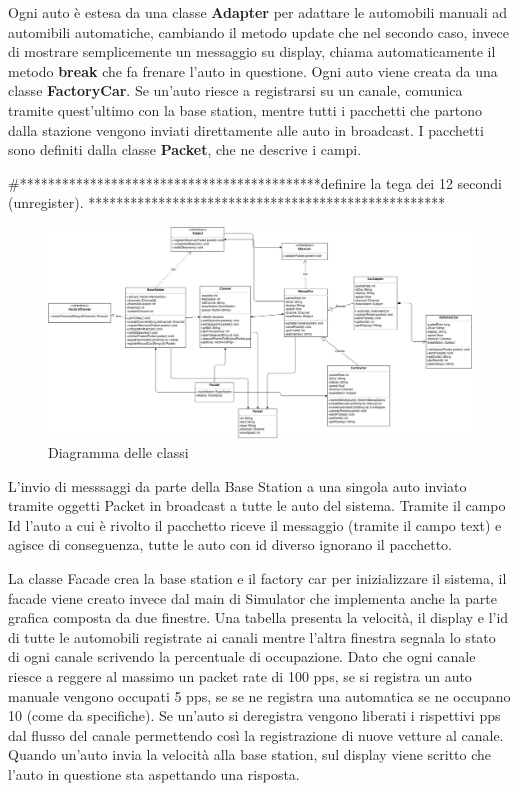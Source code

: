 \documentclass[a4paper,10pt]{article}
\begin{document}
Ogni auto è estesa da una classe \textbf{Adapter} per adattare le automobili manuali ad automibili automatiche, cambiando il metodo update che nel secondo caso, invece di mostrare semplicemente un messaggio su display, chiama automaticamente il metodo \textbf{break} che fa frenare l'auto in questione. Ogni auto viene creata da una classe \textbf{FactoryCar}. Se un'auto riesce a registrarsi su un canale, comunica tramite quest'ultimo con la base station, mentre tutti i pacchetti che partono dalla stazione vengono inviati direttamente alle auto in broadcast. I pacchetti sono definiti dalla classe \textbf{Packet}, che ne descrive i campi.

#*******************************************definire la tega dei 12 secondi (unregister). ***************************************************


\begin{figure}[htbp]
\includegraphics[scale=0.24]{class_diagram.jpg}
\caption{Diagramma delle classi}
\label{class_dig}
\end{figure}

L'invio di messsaggi da parte della Base Station a una singola auto inviato tramite oggetti Packet in broadcast a tutte le auto del sistema.
Tramite il campo Id l'auto a cui è rivolto il pacchetto riceve il messaggio (tramite il campo text) e agisce di conseguenza, tutte le auto con id diverso ignorano il pacchetto.

La classe Facade crea la base station e il factory car per inizializzare il sistema, il facade viene creato invece dal main di Simulator che implementa anche la parte grafica composta da due finestre.
Una tabella presenta la velocità, il display e l'id di tutte le automobili registrate ai canali mentre l'altra finestra segnala lo stato di ogni canale scrivendo la percentuale di occupazione. Dato che ogni canale riesce a reggere al massimo un packet rate di 100 pps, se si registra un auto manuale vengono occupati 5 pps, se se ne registra una automatica se ne occupano 10 (come da specifiche). 
Se un'auto si deregistra vengono liberati i rispettivi pps dal flusso del canale permettendo così la registrazione di nuove vetture al canale.
Quando un'auto invia la velocità alla base station, sul display viene scritto che l'auto in questione sta aspettando una risposta. 
\end{document}
